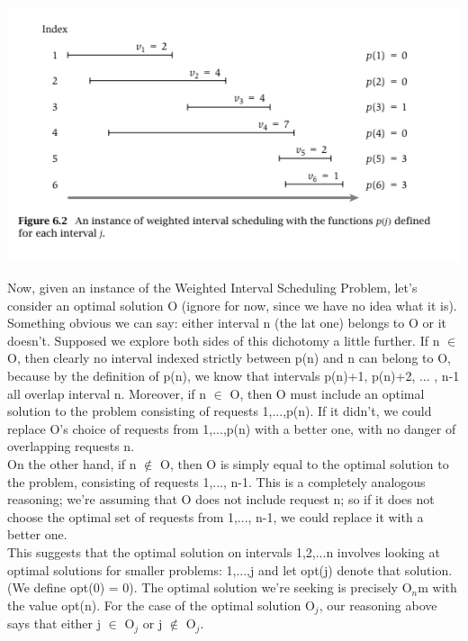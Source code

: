 \documentclass{article}
\begin{document}
\begin{center}
    \includegraphics[]{figures/fig6.png}
\end{center}

Now, given an instance of the Weighted Interval Scheduling Problem, let's consider an optimal solution O (ignore for now, since we have no idea what it is). Something obvious we can say: either interval n (the lat one) belongs to O or it doesn't. Supposed we explore both sides of this dichotomy a little further. If n $\in$ O, then clearly no interval indexed strictly between p(n) and n can belong to O, because by the definition of p(n), we know that intervals p(n)+1, p(n)+2, ... , n-1 all overlap interval n. Moreover, if n $\in$ O, then O must include an optimal solution to the problem consisting of requests {1,...,p(n)}. If it didn't, we could replace O's choice of requests from {1,...,p(n)} with a better one, with no danger of overlapping requests n.\\

On the other hand, if n $\notin$ O, then O is simply equal to the optimal solution to the problem, consisting of requests {1,..., n-1}. This is a completely analogous reasoning; we're assuming that O does not include request n; so if it does not choose the optimal set of requests from {1,..., n-1}, we could replace it with a better one.\\

This suggests that the optimal solution on intervals {1,2,...n} involves looking at optimal solutions for smaller problems: {1,...,j} and let opt(j) denote that solution. (We define opt(0) = 0). The optimal solution we're seeking is precisely O$_n$m with the value opt(n). For the case of the optimal solution O$_j$, our reasoning above says that either j $\in$ O$_j$ or j $\notin$ O$_j$.\\
\end{document}
